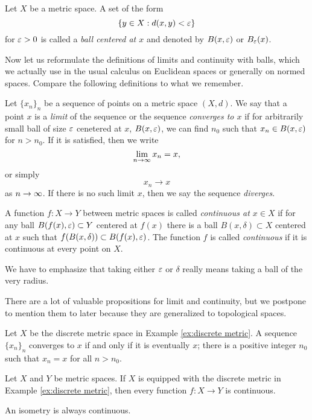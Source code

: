 \documentclass{../crs}
\begin{document}
\begin{defn}
Let $X$ be a metric space.
A set of the form 
\[\{y\in X:d(x,y)<\varepsilon\}\]
for $\varepsilon>0$ is called a \emph{ball centered at $x$} and denoted by $B(x,\varepsilon)$ or $B_\varepsilon(x)$.
\end{defn}

Now let us reformulate the definitions of limits and continuity with balls, which we actually use in the usual calculus on Euclidean spaces or generally on normed spaces.
Compare the following definitions to what we remember.

\begin{defn}
Let $\{x_n\}_n$ be a sequence of points on a metric space $(X,d)$.
We say that a point $x$ is a \emph{limit} of the sequence or the sequence \emph{converges to $x$} if for arbitrarily small ball of size $\varepsilon$ cenetered at $x$, $B(x,\varepsilon)$, we can find $n_0$ such that $x_n\in B(x,\varepsilon)$ for $n>n_0$.
If it is satisfied, then we write
\[\lim_{n\to\oo}x_n=x,\]
or simply
\[x_n\to x\]
as $n\to\oo$.
If there is no such limit $x$, then we say the sequence \emph{diverges}.
\end{defn}
\begin{defn}
A function $f:X\to Y$ between metric spaces is called \emph{continuous at $x\in X$} if for any ball $B(f(x),\varepsilon)\subset Y$ centered at $f(x)$ there is a ball $B(x,\delta)\subset X$ centered at $x$ such that $f(B(x,\delta))\subset B(f(x),\varepsilon)$.
The function $f$ is called \emph{continuous} if it is continuous at every point on $X$.
\end{defn}

We have to emphasize that taking either $\varepsilon$ or $\delta$ really means taking a ball of the very radius.






There are a lot of valuable propositions for limit and continuity, but we postpone to mention them to later because they are generalized to topological spaces.

\begin{ex}
Let $X$ be the discrete metric space in Example \ref{ex:discrete metric}.
A sequence $\{x_n\}_n$ converges to $x$ if and only if it is eventually $x$; there is a positive integer $n_0$ such that $x_n=x$ for all $n>n_0$.
\end{ex}
\begin{ex}
Let $X$ and $Y$ be metric spaces.
If $X$ is equipped with the discrete metric in Example \ref{ex:discrete metric}, then every function $f:X\to Y$ is continuous.
\end{ex}
\begin{ex}
An isometry is always continuous.
\end{ex}
\end{document}
